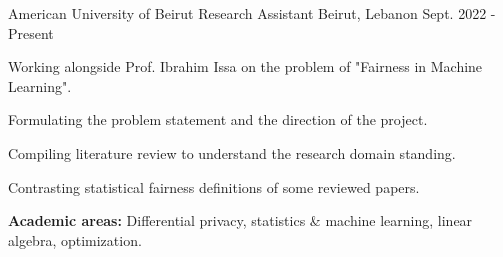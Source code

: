 

\begin{cventries}

  \cventry
    {American University of Beirut} %
    {Research Assistant} %
    {Beirut, Lebanon} %
    {Sept.  2022 - Present} %
    {
      \begin{cvitems} %
        \item {Working alongside Prof. Ibrahim Issa on the problem of "Fairness in Machine Learning".}
        \item {Formulating the problem statement and the direction of the project.}
        \item {Compiling literature review to understand the research domain standing.}
        \item {Contrasting statistical fairness definitions of some reviewed papers.}
        \item { \textbf {Academic areas:} Differential privacy, statistics \& machine learning, linear algebra, optimization.}
      \end{cvitems}
    }


\end{cventries}
